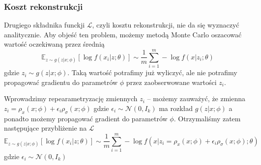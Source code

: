 \documentclass{iithesis}
\begin{document}
\subsubsection{Koszt rekonstrukcji} \label{sec:rec_loss_normal}
Drugiego składnika funckji $\mathcal{L}$, czyli kosztu rekonstrukcji,
nie da się wyznaczyć analitycznie. Aby objeść ten problem, możemy metodą Monte Carlo
oszacować wartość oczekiwaną przez średnią
$$
\mathbb{E}_{z\sim g(z|x;\phi)}\left[\log f(x_i|z;\theta)\right] \sim
\frac{1}{m} \sum_{i=1}^m -\log f(x|z_i;\theta)
$$
gdzie $z_i \sim g(z|x;\phi)$. Taką wartość potrafimy już wyliczyć, ale nie
potrafimy propagować gradientu do parametrów $\phi$ przez
zaobserwowane wartości $z_i$.

Wprowadzimy repearametryzację zmiennych $z_i$ -- możemy zauważyć, że zmienna
$z_i=\rho_x(x;\phi)+\epsilon_i\rho_\sigma(x;\phi)$
gdzie $\epsilon_i \sim \mathcal{N}(0, I_k)$
ma rozkład $g(z|x;\phi)$ a ponadto możemy propagować gradient do parametrów $\phi$.
Otrzymaliśmy zatem następujące przybliżenie na $\mathcal{L}$
$$
\mathbb{E}_{z\sim g(z|x;\phi)}\left[\log f(x_i|z;\theta)\right] \sim
\frac{1}{m} \sum_{i=1}^m -\log f(x|z_i=\rho_x(x;\phi)+\epsilon_i\rho_\sigma(x;\phi);\theta)
$$
gdzie $\epsilon_i \sim \mathcal{N}(0, I_k)$
\end{document}
